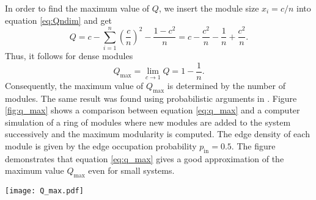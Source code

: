 In order to find the maximum value of $Q$, we insert the module size $x_i=c/n$ into equation \eqref{eq:Qndim} and get
\[
Q=c-\sum _{i=1} ^n \left( \frac{c}{n} \right) ^2 - \frac{1-c^2}{n}=c-\frac{c^2}{n}-\frac{1}{n}+\frac{c^2}{n}.
\]
Thus, it follows for dense modules
\begin{equation}\label{eq:q_max}
Q_\mathrm{max}= \lim _{c\rightarrow 1}Q=1-\frac{1}{n}.
\end{equation}
Consequently, the maximum value of $Q_\mathrm{max}$ is determined by the number of modules.
The same result was found using probabilistic arguments in \citep{Good2010}.
Figure \ref{fig:q_max} shows a comparison between equation \eqref{eq:q_max} and a computer simulation of a ring of modules where new modules are added to the system successively and the maximum modularity is computed. 
The edge density of each module is given by the edge occupation probability $p_\mathrm{in}=0.5$.
The figure demonstrates that equation \eqref{eq:q_max} gives a good approximation of the maximum value $Q_\mathrm{max}$ even for small systems.
%
\begin{SCfigure}
\texttt{[image: Q\_max.pdf]}
\caption{Equation \eqref{eq:q_max} (grey dashed line) is in good agreement with numerical simulations (red circles).
In the simulations, modules are dense, directed subgraphs ($p_\mathrm{in}=0.5$) with $32$ nodes each.
Modules are connected on a ring so that the resulting graph is connected.
}
\label{fig:q_max}
\end{SCfigure}



